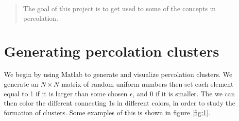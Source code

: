 \documentclass[12pt]{article}
\date{\today}
\begin{document}
 \maketitle
 \begin{abstract}
The goal of this project is to get used to some of the concepts in percolation.
 \end{abstract}
\section{Generating percolation clusters}
We begin by using Matlab to generate and visualize percolation clusters. We generate an $N\times N$ matrix of random uniform numbers then set each element equal to 1 if it is larger than some chosen $\epsilon$, and 0 if it is smaller. The we can then color the different connecting 1s in different colors, in order to study the formation of clusters. Some examples of this is shown in figure \ref{fig:1}.
\end{document}
